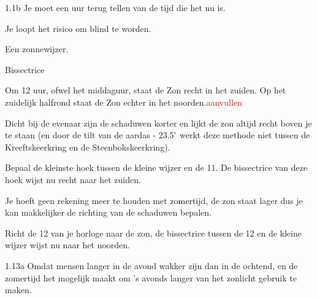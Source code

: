 \begin{Antwoord}{1.1b}
            Je moet een uur terug tellen van de tijd die het nu is.
        
\end{Antwoord}
\begin{Antwoord}{1.2}
     Je loopt het risico om blind te worden.
    
\end{Antwoord}
\begin{Antwoord}{1.3}
  Een zonnewijzer.
 
\end{Antwoord}
\begin{Antwoord}{1.5}
         Bissectrice
    
\end{Antwoord}
\begin{Antwoord}{1.7}
        Om 12 uur, ofwel het middaguur, staat de Zon recht in het zuiden. Op het zuidelijk halfrond staat de Zon echter in het noorden.\textcolor{red}{aanvullen}
    
\end{Antwoord}
\begin{Antwoord}{1.8}
        Dicht bij de evenaar zijn de schaduwen korter en lijkt de zon altijd recht boven je te staan (en door de tilt van de aardas - $23.5^{\circ}$ werkt deze methode niet tussen de Kreeftskeerkring en de Steenbokskeerkring).
    
\end{Antwoord}
\begin{Antwoord}{1.9}
        Bepaal de kleinste hoek tussen de kleine wijzer en de 11. De bissectrice van deze hoek wijst nu recht naar het zuiden.
    
\end{Antwoord}
\begin{Antwoord}{1.10}
        Je hoeft geen rekening meer te houden met zomertijd, de zon staat lager dus je kan makkelijker de richting van de schaduwen bepalen.
    
\end{Antwoord}
\begin{Antwoord}{1.12}
        Richt de 12 van je horloge naar de zon, de bissectrice tussen de 12 en de kleine wijzer wijst nu naar het noorden.
    
\end{Antwoord}
\begin{Antwoord}{1.13a}
   Omdat mensen langer in de avond wakker zijn dan in de ochtend, en de zomertijd het mogelijk maakt om 's avonds langer van het zonlicht gebruik te maken.
  
\end{Antwoord}
